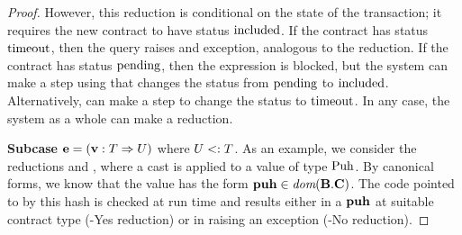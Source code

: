 \begin{proof}
  However, this reduction is conditional on the state of the
  transaction; it requires the new contract to have status
  $\text{included}$. If the contract has status $\text{timeout}$, then
  the query raises and exception, analogous to the
   reduction. If the contract has status
  $\text{pending}$, then the expression is blocked, but the system can
  make a step using  that changes the
  status from $\text{pending}$ to $\text{included}$. Alternatively,
   can make a step to change the status to
  $\text{timeout}$. In any case, the system as a whole can make a reduction.

  \textbf{Subcase } $\textbf{e} = (\textbf{v} : T \Rightarrow U)$ where $U <: T$.
  As an example, we consider the reductions  and
  , where a cast is applied to a value of type
  $\text{Puh}$. By canonical forms, we know that the value has the
  form $\textbf{puh} \in \textit{dom} (\textbf{B}.\textbf{C})$. The code pointed to
  by this hash is checked at run time and results either in a $\textbf{puh}$
  at suitable contract type (-Yes reduction) or in raising an
  exception (-No reduction). 

\end{proof}


